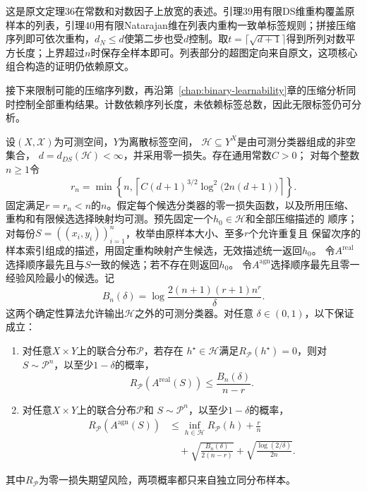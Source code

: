 这是原文定理36在常数和对数因子上放宽的表述。引理39用有限DS维重构覆盖原样本的列表，引理40用有限Natarajan维在列表内重构一致单标签规则；拼接压缩序列即可依次重构，$d_N\leq d$使第二步也受$d$控制。取$t=\lceil\sqrt{d+1}\rceil$得到所列对数平方长度；上界超过$n$时保存全样本即可。列表部分的超图定向来自原文，这项核心组合构造的证明仍依赖原文。

接下来限制可能的压缩序列数，再沿第~\ref{chap:binary-learnability}章的压缩分析同时控制全部重构结果。计数依赖序列长度，未依赖标签总数，因此无限标签仍可分析。

\begin{theorem}[有限DS维的期望风险保证]
\label{thm:finite-ds-learning-rates}
设$(X,\mathcal X)$为可测空间，$Y$为离散标签空间，
$\mathcal H\subseteq Y^X$是由可测分类器组成的非空集合，
$d=d_{DS}(\mathcal H)<\infty$，并采用零一损失。存在通用常数$C>0$；
对每个整数$n\geq1$令
\[
 r_n=\min\!\left\{n,\left\lceil
 C(d+1)^{3/2}\log^2\!\bigl(2n(d+1)\bigr)\right\rceil\right\}.
\]
固定满足$r=r_n<n$的$n$。假定每个候选分类器的零一损失函数，以及所用压缩、
重构和有限候选选择映射均可测。预先固定一个$h_0\in\mathcal H$和全部压缩描述的
顺序；对每份$S=((x_i,y_i))_{i=1}^n$，枚举由原样本大小、至多$r$个允许重复且
保留次序的样本索引组成的描述，用固定重构映射产生候选，无效描述统一返回$h_0$。
令$A^{\mathrm{real}}$选择顺序最先且与$S$一致的候选；若不存在则返回$h_0$。
令$A^{\mathrm{agn}}$选择顺序最先且零一经验风险最小的候选。记
\[
 B_n(\delta)=\log\frac{2(n+1)(r+1)n^r}{\delta}.
\]
这两个确定性算法允许输出$\mathcal H$之外的可测分类器。对任意
$\delta\in(0,1)$，以下保证成立：
\begin{enumerate}
\item 对任意$X\times Y$上的联合分布$\mathcal P$，若存在
$h^\star\in\mathcal H$满足$R_{\mathcal P}(h^\star)=0$，则对
$S\sim\mathcal P^n$，以至少$1-\delta$的概率，
 \[
 R_{\mathcal P}(A^{\mathrm{real}}(S))
 \leq\frac{B_n(\delta)}{n-r}.
 \]
\item 对任意$X\times Y$上的联合分布$\mathcal P$和
$S\sim\mathcal P^n$，以至少$1-\delta$的概率，
 \begin{align*}
 R_{\mathcal P}(A^{\mathrm{agn}}(S))
 &\leq\inf_{h\in\mathcal H}R_{\mathcal P}(h)+\frac rn\\
 &\quad+\sqrt{\frac{B_n(\delta)}{2(n-r)}}
       +\sqrt{\frac{\log(2/\delta)}{2n}}.
 \end{align*}
\end{enumerate}
其中$R_{\mathcal P}$为零一损失期望风险，两项概率都只来自独立同分布样本。
\end{theorem}

